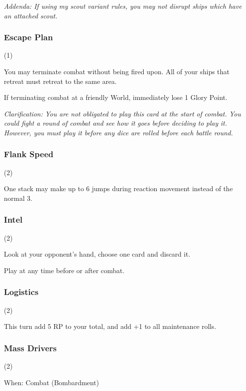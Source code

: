 \documentclass[a4paper,11pt,twocolumn]{article}
\begin{document}
\textit{Addenda: If using my scout variant rules, you may not disrupt ships which have an attached scout.}

\subsubsection{Escape Plan} (1)


You may terminate combat without being fired upon. All of your ships that retreat must retreat to the same area.

If terminating combat at a friendly World, immediately lose 1 Glory Point.

\textit{Clarification: You are not obligated to play this card at the start of combat. You could fight a round of combat and see how it goes before deciding to play it. However, you must play it before any dice are rolled before each battle round.}

\subsubsection{Flank Speed} (2)


One stack may make up to 6 jumps during reaction movement instead of the normal 3.

\subsubsection{Intel} (2)


Look at your opponent's hand, choose one card and discard it.

Play at any time before or after combat.

\subsubsection{Logistics} (2)


This turn add 5 RP to your total, and add +1 to all maintenance rolls.

\subsubsection{Mass Drivers} (2)

When:  Combat (Bombardment)
\end{document}

